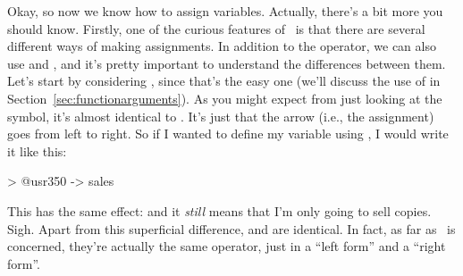 Okay, so now we know how to assign variables. Actually, there's a bit more you should know. Firstly, one of the curious features of \R\ is that there are several different ways of making assignments. In addition to the \rtext{<-} operator, we can also use \rtext{->} and \rtext{=}, and it's pretty important to understand the differences between them. Let's start by considering \rtext{->}, since that's the easy one (we'll discuss the use of \rtext{=} in Section~\ref{sec:functionarguments}). As you might expect from just looking at the symbol, it's almost identical to \rtext{<-}. It's just that the arrow (i.e., the assignment) goes from left to right. So if I wanted to define my  variable using \rtext{->}, I would write it like this:
\begin{rblock1}
> @usr{350 -> sales}
\end{rblock1}
This has the same effect: and it {\it still} means that I'm only going to sell  copies. Sigh. Apart from this superficial difference, \rtext{<-} and \rtext{->} are identical. In fact, as far as \R\ is concerned, they're actually the same operator, just in a ``left form'' and a ``right form''.



